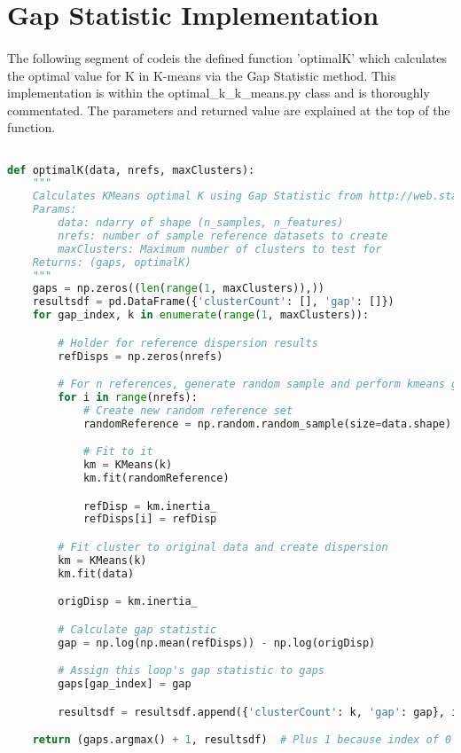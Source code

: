 \section{Gap Statistic Implementation}
\label{gapstatistic}

\paragraph{}The following segment of codeis the defined function 'optimalK' which calculates the optimal value for K in K-means via the Gap Statistic method. This implementation is within the optimal\_k\_k\_means.py class and is thoroughly commentated.  The parameters and returned value are explained at the top of the function.

\begin{lstlisting}[language=python]

def optimalK(data, nrefs, maxClusters):
    """
    Calculates KMeans optimal K using Gap Statistic from http://web.stanford.edu/~hastie/Papers/gap.pdf
    Params:
        data: ndarry of shape (n_samples, n_features)
        nrefs: number of sample reference datasets to create
        maxClusters: Maximum number of clusters to test for
    Returns: (gaps, optimalK)
    """
    gaps = np.zeros((len(range(1, maxClusters)),))
    resultsdf = pd.DataFrame({'clusterCount': [], 'gap': []})
    for gap_index, k in enumerate(range(1, maxClusters)):

        # Holder for reference dispersion results
        refDisps = np.zeros(nrefs)

        # For n references, generate random sample and perform kmeans getting resulting dispersion of each loop
        for i in range(nrefs):
            # Create new random reference set
            randomReference = np.random.random_sample(size=data.shape)

            # Fit to it
            km = KMeans(k)
            km.fit(randomReference)

            refDisp = km.inertia_
            refDisps[i] = refDisp

        # Fit cluster to original data and create dispersion
        km = KMeans(k)
        km.fit(data)

        origDisp = km.inertia_

        # Calculate gap statistic
        gap = np.log(np.mean(refDisps)) - np.log(origDisp)

        # Assign this loop's gap statistic to gaps
        gaps[gap_index] = gap

        resultsdf = resultsdf.append({'clusterCount': k, 'gap': gap}, ignore_index=True)

    return (gaps.argmax() + 1, resultsdf)  # Plus 1 because index of 0 means 1 cluster is optimal, index 2 = 3 clusters are optimal
\end{lstlisting}